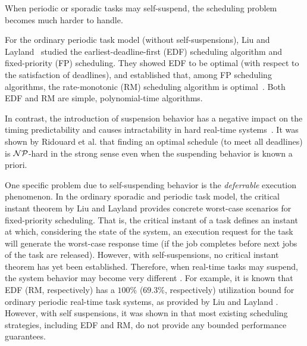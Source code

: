 
When  periodic or sporadic tasks may self-suspend, the scheduling problem becomes much harder to handle. 

For the ordinary periodic task model (without self-suspensions), Liu and Layland~ \cite{Liu_1973} studied the earliest-deadline-first (EDF) scheduling algorithm and fixed-priority (FP) scheduling. They showed EDF to be optimal (with respect to the satisfaction of deadlines), and established that, among FP scheduling algorithms, the rate-monotonic (RM) scheduling algorithm is optimal~\cite{Liu_1973}. Both EDF and RM are simple, polynomial-time algorithms. 

In contrast, the introduction of suspension behavior has a negative impact on the timing predictability and causes intractability in hard real-time systems~\cite{Ridouard_2004}. It was shown by Ridouard et al. \cite{Ridouard_2004} that finding an optimal schedule (to meet all deadlines) is ${\cal NP}$-hard in the strong sense even when the suspending behavior is known a priori.


One specific problem due to self-suspending behavior is the \emph{deferrable} execution phenomenon. In the ordinary sporadic and periodic task model, the critical instant theorem by Liu and Layland \cite{Liu_1973} provides concrete worst-case scenarios for fixed-priority scheduling.  That is, the critical instant of a task defines an instant at which, considering the state of the system, an execution request for the task will generate the worst-case response time (if the job completes before next jobs of the task are released).
However, with self-suspensions, no critical instant theorem has yet been established.
Therefore, when real-time tasks may suspend, the system behavior may become very different . For example, it is known that EDF (RM, respectively) has a $100\%$ ($69.3\%$, respectively) utilization bound for ordinary periodic real-time task systems, as provided by Liu and Layland \cite{Liu_1973}. However, with self suspensions,  it was shown in \cite{Ridouard_2004,RTSS-ChenL14} that most existing scheduling strategies, including EDF and RM, do not  provide any bounded performance guarantees. 

